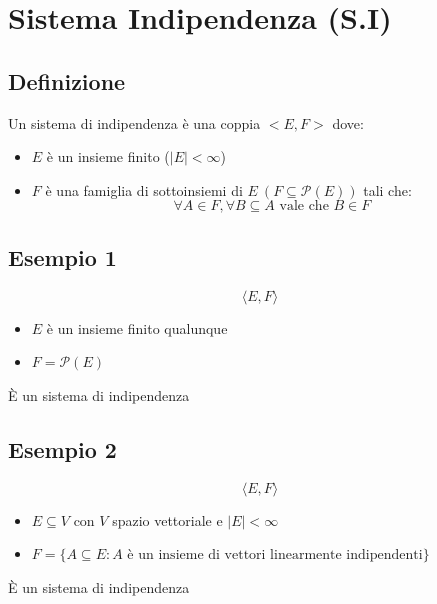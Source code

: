 \section{Sistema Indipendenza (S.I)}

\subsection{Definizione}

Un sistema di indipendenza è una coppia $<E,F>$ dove:

\begin{itemize}
    \item $E$ è un insieme finito ($|E| < \infty$)
    \item $F$ è una famiglia di sottoinsiemi di $E\ (F \subseteq \mathcal{P}(E))$ tali che:
    {
        \large
        $$
        \forall A \in F, \forall B \subseteq A \text{ vale che } B \in F
        $$
    }
\end{itemize}

\subsection{Esempio 1}
$$\langle E,F \rangle$$

\begin{itemize}
    \item $E$ è un insieme finito qualunque
    \item $F = \mathcal{P}(E)$
\end{itemize}

\begin{center}
    È un sistema di indipendenza
\end{center}

\subsection{Esempio 2}
$$
    \langle E,F \rangle
$$

\begin{itemize}
    \item $E \subseteq V$ con $V$ spazio vettoriale e $|E| < \infty$
    \item $F = \{A \subseteq E : A \text{ è un insieme di vettori linearmente indipendenti}\}$
\end{itemize}

\begin{center}
    È un sistema di indipendenza
\end{center}

